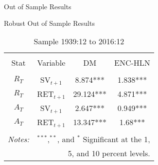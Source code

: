\documentclass{beamer}
\begin{document}
				\begin{frame}{Out of Sample Results}
					\vspace{-12pt}
					\begin{table}
						\caption{Sample 1939:12 to 2016:12}
						\vspace{-6pt}
						\begin{adjustbox}{center,max height=\totalheight}
							
						\end{adjustbox}
					\end{table}
				\end{frame}
				
				\begin{frame}{Robust Out of Sample Results}
					\vspace{-12pt}
					\begin{table}
						\caption{Sample 1939:12 to 2016:12}
						\vspace{-6pt}
						\begin{adjustbox}{center,max height=\totalheight}
							\begin{tabular}{cccc}
								\hline\\[-1.8ex]
								Stat & Variable & DM & ENC-HLN \\
								\hline\\[-1.8ex]
								$R_{T}$ & SV$_{t+1}$ & 8.874*** & 1.838*** \\
								$R_{T}$ & RET$_{t+1}$ & 29.124*** & 4.871*** \\
								$A_{T}$ & SV$_{t+1}$ & 2.647*** & 0.949*** \\
								$A_{T}$ & RET$_{t+1}$ & 13.347*** & 1.68*** \\
								\hline\\[-1.8ex]
								\textit{Notes:} & \multicolumn{3}{r}{$^{***}$,$^{**}$, and $^{*}$ Significant at the 1,}\\
								& \multicolumn{3}{r}{ 5, and 10 percent levels.}
							\end{tabular}
						\end{adjustbox}

\end{table}
\end{frame}
\end{document}
